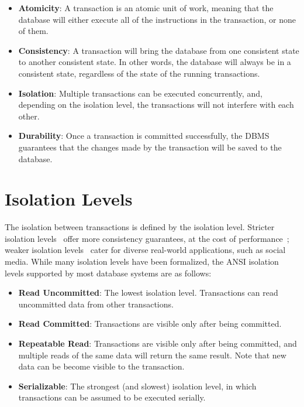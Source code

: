\begin{itemize}
    \item \textbf{Atomicity}: A transaction is an atomic unit of work, meaning that the database will either execute all of the instructions in the transaction, or none of them.
    \item \textbf{Consistency}: A transaction will bring the database from one consistent state to another consistent state. In other words, the database will always be in a consistent state, regardless of the state of the running transactions.
    \item \textbf{Isolation}: Multiple transactions can be executed concurrently, and, depending on the isolation level, the transactions will not interfere with each other.
    \item \textbf{Durability}: Once a transaction is committed successfully, the DBMS guarantees that the changes made by the transaction will be saved to the database.
\end{itemize}


\section{Isolation Levels}

The isolation between transactions is defined by the isolation level. Stricter isolation levels~\cite{si,psi,serializability} offer more consistency guarantees, at the cost of performance~\cite{hat,noc-noc}; 
weaker isolation levels~\cite{ramp,lora,ua,tcc,DBLP:conf/fase/LiuOSWGM18,pc} cater for diverse real-world applications, such as social media. 
While many isolation levels have been formalized, the ANSI isolation levels supported by most database systems \cite{melton1992iso_ANSI} are as follows:

\begin{itemize}
    \item \textbf{Read Uncommitted}: The lowest isolation level. Transactions can read uncommitted data from other transactions.
    \item \textbf{Read Committed}: Transactions are visible only after being committed.
    \item \textbf{Repeatable Read}: Transactions are visible only after being committed, and multiple reads of the same data will return the same result. Note that new data can be become visible to the transaction.
    \item \textbf{Serializable}: The strongest (and slowest) isolation level, in which transactions can be assumed to be executed serially.
\end{itemize}

